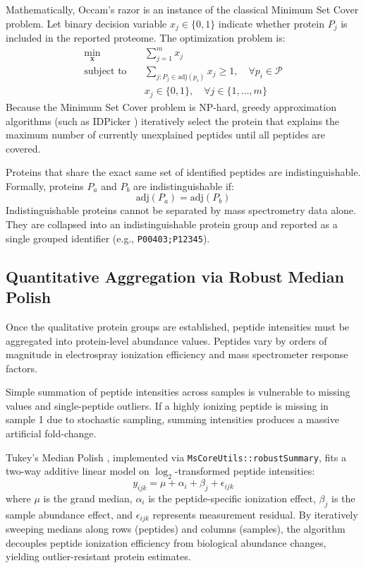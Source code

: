 \documentclass[11pt,twoside,openright]{book}
\begin{document}
Mathematically, Occam's razor is an instance of the classical Minimum Set Cover problem. Let binary decision variable $x_j \in \{0, 1\}$ indicate whether protein $P_j$ is included in the reported proteome. The optimization problem is:
\begin{align}
\min_{\mathbf{x}} \quad & \sum_{j=1}^m x_j \label{eq:set_cover_objective} \\
\text{subject to} \quad & \sum_{j : P_j \in \text{adj}(p_i)} x_j \ge 1, \quad \forall p_i \in \mathcal{P} \label{eq:set_cover_constraint} \\
& x_j \in \{0, 1\}, \quad \forall j \in \{1, \dots, m\} \nonumber
\end{align}
Because the Minimum Set Cover problem is NP-hard, greedy approximation algorithms (such as IDPicker \cite{zhang2007idpicker, chvatal1979greedy}) iteratively select the protein that explains the maximum number of currently unexplained peptides until all peptides are covered.

Proteins that share the exact same set of identified peptides are indistinguishable. Formally, proteins $P_a$ and $P_b$ are indistinguishable if:
\begin{equation}
\text{adj}(P_a) = \text{adj}(P_b)
\label{eq:indistinguishable}
\end{equation}
Indistinguishable proteins cannot be separated by mass spectrometry data alone. They are collapsed into an indistinguishable protein group and reported as a single grouped identifier (e.g., \texttt{P00403;P12345}).

\subsection{Quantitative Aggregation via Robust Median Polish}
Once the qualitative protein groups are established, peptide intensities must be aggregated into protein-level abundance values. Peptides vary by orders of magnitude in electrospray ionization efficiency and mass spectrometer response factors.

Simple summation of peptide intensities across samples is vulnerable to missing values and single-peptide outliers. If a highly ionizing peptide is missing in sample 1 due to stochastic sampling, summing intensities produces a massive artificial fold-change.

Tukey's Median Polish \cite{tukey1977exploratory, goeminne2016msqrob, zhu2020deqms}, implemented via \texttt{MsCoreUtils::robustSummary}, fits a two-way additive linear model on $\log_2$-transformed peptide intensities:
\begin{equation}
y_{ijk} = \mu + \alpha_i + \beta_j + \epsilon_{ijk}
\label{eq:median_polish}
\end{equation}
where $\mu$ is the grand median, $\alpha_i$ is the peptide-specific ionization effect, $\beta_j$ is the sample abundance effect, and $\epsilon_{ijk}$ represents measurement residual. By iteratively sweeping medians along rows (peptides) and columns (samples), the algorithm decouples peptide ionization efficiency from biological abundance changes, yielding outlier-resistant protein estimates.
\end{document}
